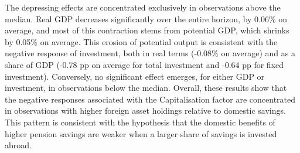 \documentclass[11pt,english,a4paper, twoside, authoryear]{article}
\begin{document}
The depressing effects are concentrated exclusively in observations above the median. Real GDP decreases significantly over the entire horizon, by 0.06\% on average, and most of this contraction stems from potential GDP, which shrinks by 0.05\% on average. This erosion of potential output is consistent with the negative response of investment, both in real terms (-0.08\% on average) and as a share of GDP (-0.78 pp on average for total investment and -0.64 pp for fixed investment). Conversely, no significant effect emerges, for either GDP or investment, in observations below the median. Overall, these results show that the negative responses associated with the Capitalisation factor are concentrated in observations with higher foreign asset holdings relative to domestic savings. This pattern is consistent with  the hypothesis that the domestic benefits of higher pension savings are weaker when a larger share of savings is invested abroad.

\end{document}
